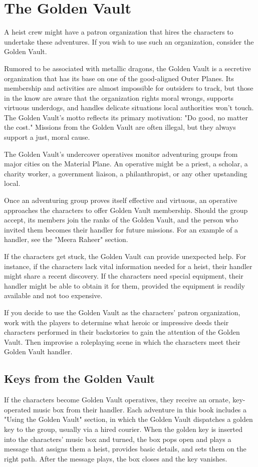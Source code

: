 \documentclass[10pt,a4paper,twoside,bg=print,twocolumn,openany,nodeprecatedcode]{dndbook}
\begin{document}
\section{The Golden Vault}
A heist crew might have a patron organization that hires the characters to undertake these adventures. If you wish to use such an organization, consider the Golden Vault.

Rumored to be associated with metallic dragons, the Golden Vault is a secretive organization that has its base on one of the good-aligned Outer Planes. Its membership and activities are almost impossible for outsiders to track, but those in the know are aware that the organization rights moral wrongs, supports virtuous underdogs, and handles delicate situations local authorities won't touch. The Golden Vault's motto reflects its primary motivation: "Do good, no matter the cost." Missions from the Golden Vault are often illegal, but they always support a just, moral cause.

The Golden Vault's undercover operatives monitor adventuring groups from major cities on the Material Plane. An operative might be a priest, a scholar, a charity worker, a government liaison, a philanthropist, or any other upstanding local.

Once an adventuring group proves itself effective and virtuous, an operative approaches the characters to offer Golden Vault membership. Should the group accept, its members join the ranks of the Golden Vault, and the person who invited them becomes their handler for future missions. For an example of a handler, see the "Meera Raheer" section.

If the characters get stuck, the Golden Vault can provide unexpected help. For instance, if the characters lack vital information needed for a heist, their handler might share a recent discovery. If the characters need special equipment, their handler might be able to obtain it for them, provided the equipment is readily available and not too expensive.

If you decide to use the Golden Vault as the characters' patron organization, work with the players to determine what heroic or impressive deeds their characters performed in their backstories to gain the attention of the Golden Vault. Then improvise a roleplaying scene in which the characters meet their Golden Vault handler.

\subsection{Keys from the Golden Vault}
If the characters become Golden Vault operatives, they receive an ornate, key-operated music box from their handler. Each adventure in this book includes a "Using the Golden Vault" section, in which the Golden Vault dispatches a golden key to the group, usually via a hired courier. When the golden key is inserted into the characters' music box and turned, the box pops open and plays a message that assigns them a heist, provides basic details, and sets them on the right path. After the message plays, the box closes and the key vanishes.
\end{document}
